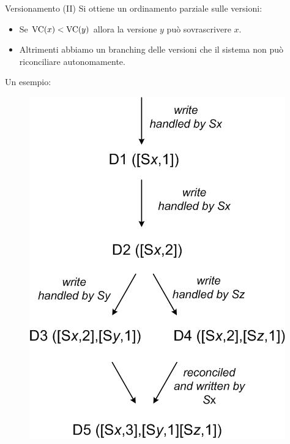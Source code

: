 \begin{frame}{Versionamento (II)}
  Si ottiene un ordinamento parziale sulle versioni:
  \begin{itemize}
  \item Se $\mathrm{VC}(x) < \mathrm{VC}(y)$ allora la versione $y$ può sovrascrivere $x$.
  \item Altrimenti abbiamo un branching delle versioni che il sistema non può riconciliare autonomamente.
  \end{itemize}
  
  Un esempio:
  \begin{figure}
  \centering
  \includegraphics[scale=0.3]{dynamo/versioning.png}
  \end{figure}  
\end{frame}


